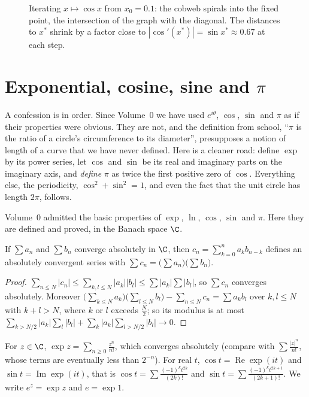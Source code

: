 \begin{figure}[ht]
\centering
{}
\caption{Iterating $x\mapsto\cos x$ from $x_0=0.1$: the cobweb spirals into the fixed point, the intersection of the graph with the diagonal.
The distances to $x^*$ shrink by a factor close to $|\cos'(x^*)|=\sin x^*\approx0.67$ at each step.}
\label{fig:cobweb}
\end{figure}

\section{Exponential, cosine, sine and \texorpdfstring{$\pi$}{pi}}

A confession is in order. Since Volume~0 we have used $e^{i\theta}$, $\cos$, $\sin$ and $\pi$ as if their properties were
obvious. They are not, and the definition from school, ``$\pi$ is the ratio of a circle's circumference to its
diameter'', presupposes a notion of length of a curve that we have never defined. Here is a cleaner road: define $\exp$
by its power series, let $\cos$ and $\sin$ be its real and imaginary parts on the imaginary axis, and \emph{define} $\pi$
as twice the first positive zero of $\cos$. Everything else, the periodicity, $\cos^2+\sin^2=1$, and even the fact that
the unit circle has length $2\pi$, follows.

Volume~0 admitted the basic properties of $\exp$, $\ln$, $\cos$, $\sin$ and $\pi$. Here they are defined and proved, in the Banach space $\C$.

\begin{lemma}\label{lem:cauchyproduct}
If $\sum a_n$ and $\sum b_n$ converge absolutely in $\C$, then $c_n=\sum_{k=0}^na_kb_{n-k}$ defines an absolutely convergent series with
$\sum c_n=\bigl(\sum a_n\bigr)\bigl(\sum b_n\bigr)$.
\end{lemma}
\begin{proof}
$\sum_{n\le N}|c_n|\le\sum_{k,l\le N}|a_k||b_l|\le\sum|a_k|\sum|b_l|$, so $\sum c_n$ converges absolutely. Moreover
$\bigl(\sum_{k\le N}a_k\bigr)\bigl(\sum_{l\le N}b_l\bigr)-\sum_{n\le N}c_n=\sum a_kb_l$ over $k,l\le N$ with $k+l>N$, where $k$ or $l$ exceeds $\frac N2$; so its modulus is at
most $\sum_{k>N/2}|a_k|\sum_l|b_l|+\sum_k|a_k|\sum_{l>N/2}|b_l|\to0$.
\end{proof}

\begin{definition}
For $z\in\C$, $\exp z=\sum_{n\ge0}\frac{z^n}{n!}$, which converges absolutely (compare with $\sum\frac{|z|^n}{n!}$, whose terms are eventually less than
$2^{-n}$). For real $t$, $\cos t=\operatorname{Re}\exp(it)$ and $\sin t=\operatorname{Im}\exp(it)$, that is $\cos t=\sum\frac{(-1)^kt^{2k}}{(2k)!}$ and $\sin t=\sum\frac{(-1)^kt^{2k+1}}{(2k+1)!}$.
We write $e^z=\exp z$ and $e=\exp1$.
\end{definition}


